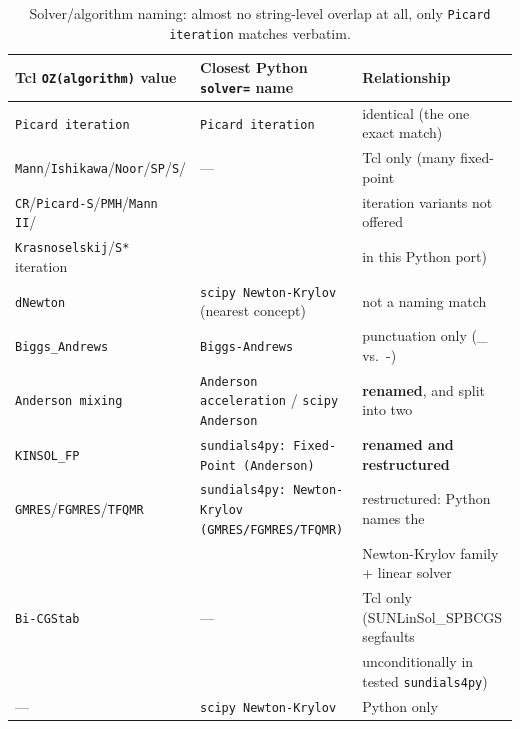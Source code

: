 \documentclass[11pt,a4paper]{article}
\newcommand{\code}[1]{\texttt{#1}}
\begin{document}
\begin{table}[h]
\centering
\footnotesize
\begin{tabular}{lll}
\toprule
Tcl \code{OZ(algorithm)} value & Closest Python \code{solver=} name & Relationship \\
\midrule
\code{Picard iteration} & \code{Picard iteration} & identical (the one exact match) \\
\code{Mann}/\code{Ishikawa}/\code{Noor}/\code{SP}/\code{S}/ & --- & Tcl only (many fixed-point \\
\code{CR}/\code{Picard-S}/\code{PMH}/\code{Mann II}/ & & iteration variants not offered \\
\code{Krasnoselskij}/\code{S*} iteration & & in this Python port) \\
\code{dNewton} & \code{scipy Newton-Krylov} (nearest concept) & not a naming match \\
\code{Biggs\_Andrews} & \code{Biggs-Andrews} & punctuation only (\_ vs.\ -) \\
\code{Anderson mixing} & \code{Anderson acceleration} / \code{scipy Anderson} & \textbf{renamed}, and split into two \\
\code{KINSOL\_FP} & \code{sundials4py: Fixed-Point (Anderson)} & \textbf{renamed and restructured} \\
\code{GMRES}/\code{FGMRES}/\code{TFQMR} & \code{sundials4py: Newton-Krylov (GMRES/FGMRES/TFQMR)} & restructured: Python names the \\
& & Newton-Krylov family + linear solver \\
\code{Bi-CGStab} & --- & Tcl only (SUNLinSol\_SPBCGS segfaults \\
& & unconditionally in tested \code{sundials4py}) \\
--- & \code{scipy Newton-Krylov} & Python only \\
\bottomrule
\end{tabular}
\caption{Solver/algorithm naming: almost no string-level overlap at all, only
\code{Picard iteration} matches verbatim.}
\label{tab:solver-naming}
\end{table}
\end{document}
